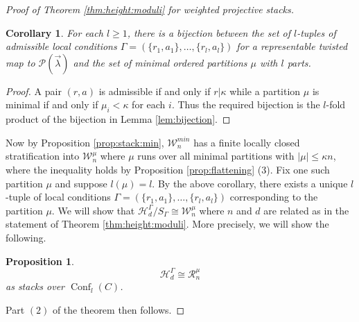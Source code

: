 \documentclass[a4paper,12pt]{amsart}
\newtheorem{cor}[thm]{Corollary}
\newtheorem{prop}[thm]{Proposition}
\theoremstyle{definition}
\newcommand{\cW}{\mathcal{W}}
\newcommand{\cH}{\mathcal{H}}
\newcommand{\cR}{\mathcal{R}}
\DeclareMathOperator{\Conf}{Conf}
\newcommand{\Pcv}{\mathcal{P}(\vec{\lambda})}
\begin{document}
\begin{proof}[{Proof of Theorem \ref{thm:height:moduli} for weighted projective stacks}]
		\begin{cor}\label{cor:bijection} For each $l \geq 1$, there is a bijection between the set of $l$-tuples of admissible local conditions $\Gamma = \left(\{r_1, a_1\}, \ldots, \{r_l, a_l\}\right)$ for a representable twisted map to $\Pcv$ and the set of minimal ordered partitions $\mu$ with $l$ parts. 
		\end{cor}
		\begin{proof} 
			A pair $(r,a)$ is admissible if and only if $r | \kappa$ while a partition $\mu$ is minimal if and only if $\mu_i < \kappa$ for each $i$. Thus the required bijection is the $l$-fold product of the bijection in Lemma \ref{lem:bijection}.
		\end{proof} 
		
		Now by Proposition \ref{prop:stack:min}, $\cW^{min}_n$ has a finite locally closed stratification into $\cW^\mu_n$ where $\mu$ runs over all minimal partitions with $|\mu| \le \kappa n$, where the inequality holds by Proposition \ref{prop:flattening} (3). Fix one such partition $\mu$ and suppose $l(\mu) = l$. By the above corollary, there exists a unique $l$-tuple of local conditions $\Gamma = (\{r_1, a_1\}, \ldots, \{r_l, a_l\})$ corresponding to the partition $\mu$. We will show that $\cH^\Gamma_d/S_\Gamma \cong \cW^\mu_n$ where $n$ and $d$ are related as in the statement of Theorem \ref{thm:height:moduli}. More precisely, we will show the following.
		\begin{prop}\label{prop:iso-HGammad-Rmun}
			$$\cH^\Gamma_d \cong \cR^\mu_n$$
			as stacks over $\Conf_l(C)$.
		\end{prop}
		Part $(2)$ of the theorem then follows.  
		

\end{proof}
\end{document}
